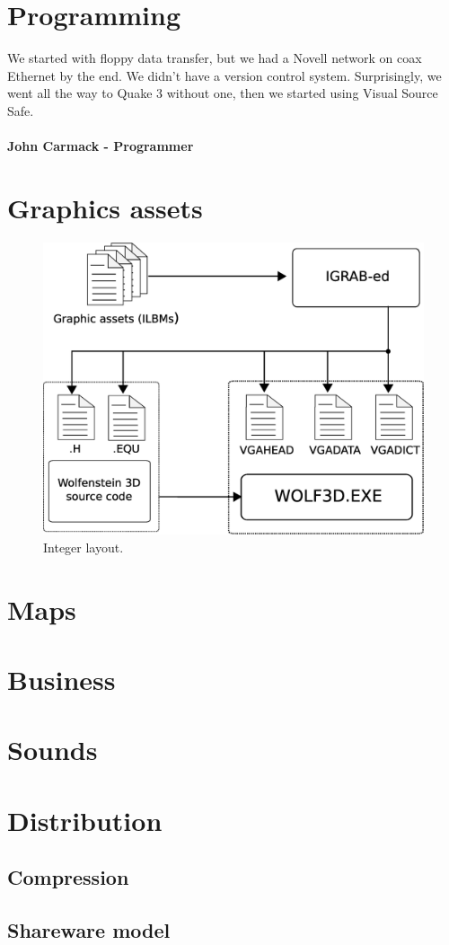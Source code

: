 \documentclass[book.tex]{subfiles}
\begin{document}
\section{Programming}

 \begin{fancyquotes}
We started with floppy data transfer, but we had a Novell network on coax Ethernet by the end.
 \bigskip
We didn’t have a version control system.  Surprisingly, we went all the way to Quake 3 without one, then we started using Visual Source Safe.\\
 \\
\textbf{John Carmack - Programmer}
\end{fancyquotes}

\section{Graphics assets}

\begin{figure}[H]
\centering
 \includegraphics[scale=0.4]{imgs/drawing_plain.eps}
 \caption{Integer layout.} \label{fig:mips}
 \end{figure}

\section{Maps}
\section{Business}
\section{Sounds}
\section{Distribution}
	\subsection{Compression}
	\subsection{Shareware model}
\end{document}
